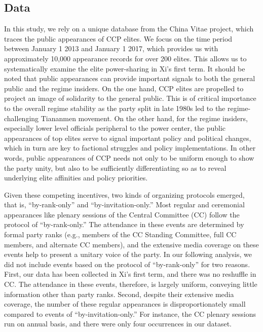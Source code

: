 \documentclass[11pt,english]{article}
\begin{document}
\begin{flushleft}

\section*{Data}

In this study, we rely on a unique database from the China Vitae project, which traces the public appearances of CCP elites. We focus on the time period between January 1 2013 and January 1 2017, which provides us with approximately 10,000 appearance records for over 200 elites. This allows us to systematically examine the elite power-sharing in Xi's first term. It should be noted that public appearances can provide important signals to both the general public and the regime insiders.  On the one hand, CCP elites are propelled to project an image of solidarity to the general public.  This is of critical importance to the overall regime stability as the party split in late 1980s led to the regime-challenging Tiananmen movement.  On the other hand, for the regime insiders, especially lower level officials peripheral to the power center, the public appearances of top elites serve to signal important policy and political changes, which in turn are key to factional struggles and policy implementations.   In other words, public appearances of CCP needs not only to be uniform enough to show the party unity, but also to be sufficiently differentiating so as to reveal underlying elite affinities and policy priorities.

Given these competing incentives, two kinds of organizing protocols emerged, that is, “by-rank-only” and “by-invitation-only.”  Most regular and ceremonial appearances like plenary sessions of the Central Committee (CC) follow the protocol of “by-rank-only.”  The attendance in these events are determined by formal party ranks (e.g., members of the CC Standing Committee, full CC members, and alternate CC members), and the extensive media coverage on these events help to present a unitary voice of the party.  In our following analysis, we did not include events based on the protocol of “by-rank-only” for two reasons.  First, our data has been collected in Xi’s first term, and there was no reshuffle in CC.  The attendance in these events, therefore, is largely uniform, conveying little information other than party ranks.  Second, despite their extensive media coverage, the number of these regular appearances is disproportionately small compared to events of “by-invitation-only.”  For instance, the CC plenary sessions run on annual basis, and there were only four occurrences in our dataset.


\end{flushleft}
\end{document}
